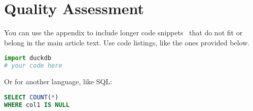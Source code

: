 \documentclass[sigconf]{acmart}
\begin{document}



\appendix

\section{Quality Assessment}

You can use the appendix to include longer code snippets~\cite{raasveldt:2019} that do not fit or belong in the main article text. Use code listings, like the ones provided below.

\begin{lstlisting}[language=Python]
import duckdb
# your code here
\end{lstlisting}

Or for another language, like SQL:

\begin{lstlisting}[language=SQL]
SELECT COUNT(*)
WHERE col1 IS NULL
\end{lstlisting}
\end{document}
